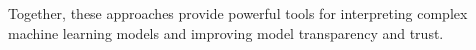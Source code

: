 \documentclass{article}
\begin{document}
Together, these approaches provide powerful tools for interpreting complex machine learning models and improving model transparency and trust.












\end{document}
